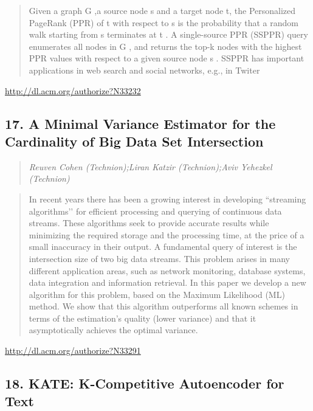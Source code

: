\documentclass{article}
\begin{document}
\begin{quote}
Given a graph G ,a source node s and a target node t, the Personalized PageRank (PPR) of t with respect to s is the probability that a random walk starting from s terminates at t . A single-source PPR (SSPPR) query enumerates all nodes in G , and returns the top-k nodes with the highest PPR values with respect to a given source node s . SSPPR has important applications in web search and social networks, e.g., in Twiter
\end{quote}

\href{http://dl.acm.org/authorize?N33232}{http://dl.acm.org/authorize?N33232}

\subsection{17. A Minimal Variance Estimator for the Cardinality of Big Data Set Intersection}

\begin{quote}
\footnotesize{\textit{Reuven Cohen (Technion);Liran Katzir (Technion);Aviv Yehezkel (Technion)}}

\end{quote}

\begin{quote}
In recent years there has been a growing interest in developing ``streaming algorithms’’ for efficient processing and querying of continuous data streams. These algorithms seek to provide accurate results while minimizing the required storage and the processing time, at the price of a small inaccuracy in their output. A fundamental query of interest is the intersection size of two big data streams. This problem arises in many different application areas, such as network monitoring, database systems, data integration and information retrieval. In this paper we develop a new algorithm for this problem, based on the Maximum Likelihood (ML) method. We show that this algorithm outperforms all known schemes in terms of the estimation’s quality (lower variance) and that it asymptotically achieves the optimal variance.
\end{quote}

\href{http://dl.acm.org/authorize?N33291}{http://dl.acm.org/authorize?N33291}

\subsection{18. KATE: K-Competitive Autoencoder for Text}
\end{document}
